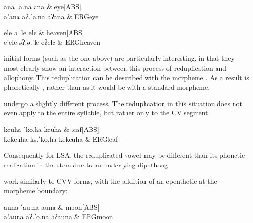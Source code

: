 \begin{subexamples}
  \ex
    \preamble ana
    \pronunciation ˈa.na
    \gloss
      ana & eye[ABS] \\
  \ex
    \preamble a'ana
    \pronunciation aʔ.ˈa.na
    \gloss
      aʔ\allo ana & ERG\allo eye \\
\end{subexamples}

\begin{subexamples}
  \ex
    \preamble ele
    \pronunciation ə.ˈle
    \gloss
      ele & heaven[ABS] \\
  \ex
    \preamble e'ele
    \pronunciation əʔ.ə.ˈle
    \gloss
      eʔ\allo ele & ERG\allo heaven \\
\end{subexamples}

 initial forms (such as the one above) are particularly interesting, in that they most clearly show an interaction between this process of reduplication and allophony. This reduplication can be described with the morpheme . As a result  is phonetically , rather than  as it would be with a standard morpheme.

 undergo a slightly different process. The reduplication in this situation does not even apply to the entire syllable, but rather only to the CV segment.

\begin{subexamples}
  \ex
    \preamble keuha
    \pronunciation ˈko.ha
    \gloss
      keuha & leaf[ABS] \\
  \ex
    \preamble kekeuha
    \pronunciation kə.ˈko.ha
    \gloss
      ke\allo keuha & ERG\allo leaf \\
\end{subexamples}

Consequently for LSA, the reduplicated vowel may be different than its phonetic realization in the stem due to an underlying diphthong.

 work similarly to CVV forms, with the addition of an epenthetic  at the morpheme boundary:

\begin{subexamples}
  \ex
    \preamble auna
    \pronunciation ˈau.na
    \gloss
      auna & moon[ABS] \\
  \ex
    \preamble a'auna
    \pronunciation aʔ.ˈo.na
    \gloss
      aʔ\allo auna & ERG\allo moon \\
\end{subexamples}

